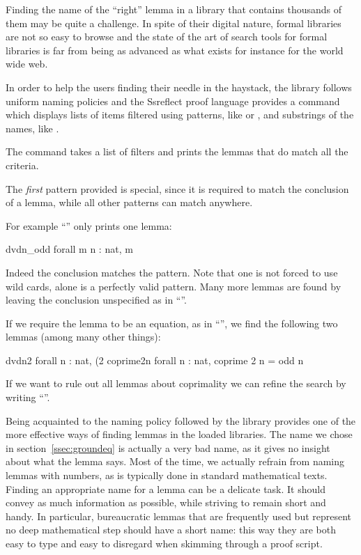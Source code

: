 Finding the name of the ``right'' lemma in a library that contains
thousands of them may be quite a challenge. In spite of their digital
nature, formal libraries are not so easy to browse and the state
of the art of search tools for formal libraries is far from being as
advanced as what exists for instance for the world wide web.

In order to help the users finding their needle in the haystack,
the \mcbMC{} library follows uniform naming policies and the Ssreflect
proof language provides a  command which displays lists of
items filtered using patterns, like \C{(_ * _ + _)}
or , and substrings of the names, like .



The  command takes a list of filters and prints the lemmas
that do match all the criteria.

The \emph{first} pattern provided is special, since it is required to match
the conclusion of a lemma, while all other patterns can match anywhere.

For example ``'' only prints one lemma:

\begin{coq}{}{}
dvdn_odd  forall m n : nat, m %
\end{coq}
Indeed the conclusion matches the pattern.  Note that one is not forced to
use wild cards,  alone is a perfectly valid pattern.  Many more
lemmas are found by leaving the conclusion unspecified as in ``''.

If we require the lemma to be an equation, as in ``'', we find
the following two lemmas (among many other things):

\begin{coqout}{}{}
dvdn2  forall n : nat, (2 %
coprime2n  forall n : nat, coprime 2 n = odd n
\end{coqout}
If we want to rule out all lemmas about coprimality we can refine the
search by writing ``''.


Being acquainted to the naming policy followed by the \mcbMC{} library
provides one of the more effective ways of finding lemmas in the
loaded libraries. The name   we chose in
section~\ref{ssec:groundeq} is actually a very bad name, as it gives no
insight about what the lemma says. Most of the time, we actually
refrain  from naming lemmas with numbers, as is typically done in
standard mathematical texts. Finding an appropriate name for a
lemma can be a delicate task. It should convey as much information as
possible, while striving to remain short and handy. In particular,
bureaucratic lemmas that are frequently used but represent no deep
mathematical step should have a short name: this way they are both
easy to type and easy to disregard when skimming through a proof
script.


